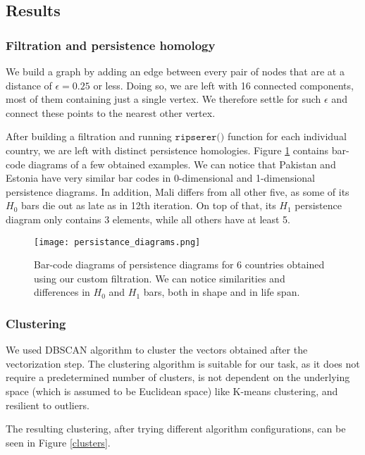 \documentclass{article}
\begin{document}
\subsection{Results}

\subsubsection{Filtration and persistence homology}
We build a graph by adding an edge between every pair of nodes that are at a distance of $\epsilon = 0.25$ or less.
Doing so, we are left with 16 connected components, most of them containing just a single vertex. 
We therefore settle for such $\epsilon$ and connect these points to the nearest other vertex.

After building a filtration and running $\texttt{ripserer()}$ function for each individual country, we are left with distinct persistence homologies.
Figure \ref{persistence_diagrams} contains bar-code diagrams of a few obtained examples. 
We can notice that Pakistan and Estonia have very similar bar codes in 0-dimensional and 1-dimensional persistence diagrams. 
In addition, Mali differs from all other five, as some of its $H_0$ bars die out as late as in 12th iteration.
On top of that, its $H_1$ persistence diagram only contains 3 elements, while all others have at least 5.

\begin{figure}
    \centering
    \texttt{[image: persistance\_diagrams.png]}
    \caption{Bar-code diagrams of persistence diagrams for 6 countries obtained using our custom filtration. We can notice similarities and differences in $H_0$ and $H_1$ bars, both in shape and in life span.}
    \label{persistence_diagrams}
\end{figure}

\subsubsection{Clustering}

We used DBSCAN algorithm to cluster the vectors obtained after the vectorization step. The clustering algorithm is suitable for our task, as it does not require a predetermined number of clusters, is not dependent on the underlying space (which is assumed to be Euclidean space) like K-means clustering, and resilient to outliers.

The resulting clustering, after trying different algorithm configurations, can be seen in Figure \ref{clusters}.
\end{document}
